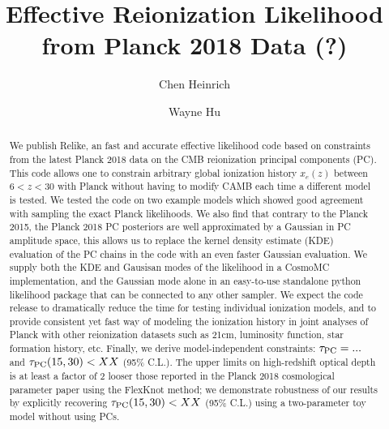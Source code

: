 \documentclass[prd,twocolumn,amsmath,amssymb,floatfix,superscriptaddress,nofootinbib]{revtex4-1}
\begin{document}
	
\title{Effective Reionization Likelihood from Planck 2018 Data (?)}

\author{Chen Heinrich}

\author{Wayne Hu}

\begin{abstract}

We publish Relike, an fast and accurate effective likelihood code based on constraints from the latest Planck 2018 data on the CMB reionization principal components (PC). This code allows one to constrain arbitrary global ionization history $x_e(z)$ between $6 < z < 30$ with Planck without having to modify CAMB each time a different model is tested. We tested the code on two example models
which showed good agreement with
sampling the exact Planck likelihoods.
We also find that contrary to the Planck 2015, the Planck 2018 PC posteriors are well approximated by a Gaussian in PC amplitude space, this allows us to replace the kernel density estimate (KDE) evaluation of the PC chains in the code with an even faster Gaussian evaluation. We supply both the KDE and Gausisan modes of the likelihood in a CosmoMC implementation, and the Gaussian mode alone in an easy-to-use standalone python likelihood package that can be connected to any other sampler. We expect the code release to dramatically reduce the time for testing individual ionization models, and to provide consistent yet fast way of modeling the ionization history in joint analyses of Planck with other reionization datasets such as 21cm, luminosity function, star formation history, etc.
Finally, we derive model-independent constraints: $\tau_{\rm PC} = ...$ and $\tau_{\rm PC}(15, 30) < XX $ (95\% C.L.). The upper limits on high-redshift optical depth is at least a factor of 2 looser those reported in the Planck 2018 cosmological parameter paper using the FlexKnot method; we demonstrate robustness of our results by explicitly recovering  $\tau_{\rm PC}(15, 30) < XX $ (95\% C.L.) using a  two-parameter toy model without using PCs.  

\end{abstract}
\pacs{}
\end{document}
